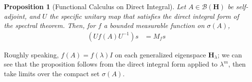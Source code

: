 \documentclass[10pt]{extarticle}
\theoremstyle{plain}
\newtheorem*{proposition}{Proposition}%
\theoremstyle{definition}
\theoremstyle{remark}
\begin{document}
  \begin{proposition}[Functional Calculus on Direct Integral]
  Let $A\in \mathcal{B}\left(\mathbf{H}\right)$ be self-adjoint, and $U$ the specific unitary map that satisfies the direct integral form of the spectral theorem. Then, for $f$ a bounded measurable function on $\sigma(A)$,
  \begin{align*}
    \left(Uf(A)U^{-1}\right)s &= M_{f}s
  \end{align*}
  \end{proposition}
  Roughly speaking, $f(A) = f(\lambda)I$ on each generalized eigenspace $\mathbf{H}_{\lambda}$; we can see that the proposition follows from the direct integral form applied to $\lambda^{m}$, then take limits over the compact set $\sigma(A)$.
\end{document}
